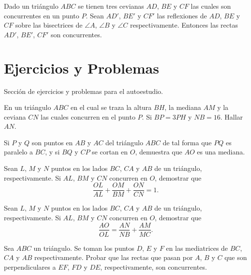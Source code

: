 \begin{section-definition}
    Dado un triángulo $ABC$ se tienen tres cevianas $AD$, $BE$ y $CF$ las cuales son concurrentes en un punto $P$.
    Sean $AD'$, $BE'$ y $CF'$ las reflexiones de $AD$, $BE$ y $CF$ sobre las bisectrices de $\angle A$, $\angle B$ y $\angle C$ respectivamente.
    Entonces las rectas $AD'$, $BE'$, $CF'$ son concurrentes.
\end{section-definition}

\section{Ejercicios y Problemas}
{
    Sección de ejercicios y problemas para el autoestudio.

    \begin{exercise}
        En un triángulo $ABC$ en el cual se traza la altura $BH$, la mediana $AM$ y la ceviana $CN$ las cuales concurren en el punto $P$.
        Si $BP = 3PH$ y $NB = 16$.
        Hallar $AN$.
    \end{exercise}

    \begin{exercise}
        Si $P$ y $Q$ son puntos en $AB$ y $AC$ del triángulo $ABC$ de tal forma que $PQ$ es paralelo a $BC$, y si $BQ$ y $CP$ se cortan en $O$, demuestra que $AO$ es una mediana.
    \end{exercise}

    \begin{exercise}
        Sean $L$, $M$ y $N$ puntos en los lados $BC$, $CA$ y $AB$ de un triángulo, respectivamente.
        Si $AL$, $BM$ y $CN$ concurren en $O$, demostrar que
        \[\frac{OL}{AL} + \frac{OM}{BM} + \frac{ON}{CN} = 1.\]
    \end{exercise}

    \begin{exercise}
        Sean $L$, $M$ y $N$ puntos en los lados $BC$, $CA$ y $AB$ de un triángulo, respectivamente.
        Si $AL$, $BM$ y $CN$ concurren en $O$, demostrar que
        \[\frac{AO}{OL} = \frac{AN}{NB} + \frac{AM}{MC}.\]
    \end{exercise}

    \begin{section-problem}
        Sea $ABC$ un triángulo.
        Se toman los puntos $D$, $E$ y $F$ en las mediatrices de $BC$, $CA$ y $AB$ respectivamente.
        Probar que las rectas que pasan por $A$, $B$ y $C$ que son perpendiculares a $EF$, $FD$ y $DE$, respectivamente, son concurrentes.
    \end{section-problem}
}